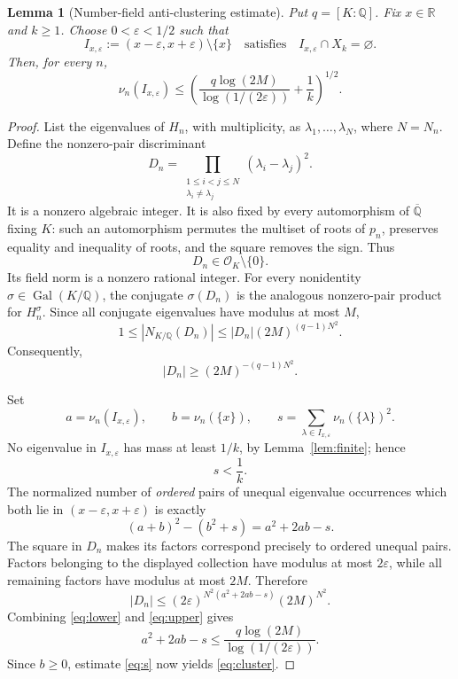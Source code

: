 \documentclass[11pt]{article}
\newtheorem{lemma}{Lemma}
\theoremstyle{definition}
\theoremstyle{remark}
\newcommand{\Q}{\mathbb{Q}}
\newcommand{\R}{\mathbb{R}}
\newcommand{\OK}{\mathcal{O}_K}
\newcommand{\Gal}{\operatorname{Gal}}
\begin{document}
\begin{lemma}[Number-field anti-clustering estimate]
\label{lem:cluster}
Put $q=[K:\Q]$.  Fix $x\in\R$ and $k\ge1$.  Choose
$0<\varepsilon<1/2$ such that
\[
 I_{x,\varepsilon}:=(x-\varepsilon,x+\varepsilon)\setminus\{x\}
 \quad\text{satisfies}\quad
 I_{x,\varepsilon}\cap X_k=\varnothing .
\]
Then, for every $n$,
\[
\nu_n(I_{x,\varepsilon})
\le
\left(
\frac{q\log(2M)}{\log(1/(2\varepsilon))}+\frac1k
\right)^{1/2}.
\tag{1}\label{eq:cluster}
\]
\end{lemma}

\begin{proof}
List the eigenvalues of $H_n$, with multiplicity, as
$\lambda_1,\ldots,\lambda_N$, where $N=N_n$.  Define the nonzero-pair
discriminant
\[
 D_n=
 \prod_{\substack{1\le i<j\le N\\\lambda_i\ne\lambda_j}}
          (\lambda_i-\lambda_j)^2 .
\]
It is a nonzero algebraic integer.  It is also fixed by every automorphism of
$\overline{\Q}$ fixing $K$: such an automorphism permutes the multiset of
roots of $p_n$, preserves equality and inequality of roots, and the square
removes the sign.  Thus
\[
                         D_n\in\OK\setminus\{0\}.
\]
Its field norm is a nonzero rational integer.  For every nonidentity
$\sigma\in\Gal(K/\Q)$, the conjugate $\sigma(D_n)$ is the analogous
nonzero-pair product for $H_n^\sigma$.  Since all conjugate eigenvalues have
modulus at most $M$,
\[
  1\le |N_{K/\Q}(D_n)|
     \le |D_n|(2M)^{(q-1)N^2}.
\]
Consequently,
\[
                         |D_n|\ge(2M)^{-(q-1)N^2}.
\tag{2}\label{eq:lower}
\]

Set
\[
 a=\nu_n(I_{x,\varepsilon}),\qquad
 b=\nu_n(\{x\}),\qquad
 s=\sum_{\lambda\in I_{x,\varepsilon}}\nu_n(\{\lambda\})^2 .
\]
No eigenvalue in $I_{x,\varepsilon}$ has mass at least $1/k$, by
Lemma~\ref{lem:finite}; hence
\[
                         s<\frac1k.
\tag{3}\label{eq:s}
\]
The normalized number of \emph{ordered} pairs of unequal eigenvalue
occurrences which both lie in $(x-\varepsilon,x+\varepsilon)$ is exactly
\[
        (a+b)^2-\left(b^2+s\right)=a^2+2ab-s.
\]
The square in $D_n$ makes its factors correspond precisely to ordered
unequal pairs.  Factors belonging to the displayed collection have modulus
at most $2\varepsilon$, while all remaining factors have modulus at most
$2M$.  Therefore
\[
 |D_n|
 \le
 (2\varepsilon)^{N^2(a^2+2ab-s)}(2M)^{N^2}.
\tag{4}\label{eq:upper}
\]
Combining \eqref{eq:lower} and \eqref{eq:upper} gives
\[
  a^2+2ab-s
  \le \frac{q\log(2M)}{\log(1/(2\varepsilon))}.
\]
Since $b\ge0$, estimate \eqref{eq:s} now yields \eqref{eq:cluster}.
\end{proof}
\end{document}
